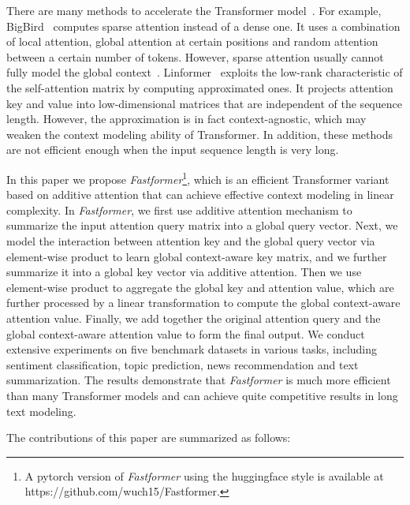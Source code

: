\documentclass[11pt,a4paper]{article}
\begin{document}
There are many methods to accelerate the Transformer model~\cite{beltagy2020longformer,zaheer2020big,wang2020linformer,Kitaev2020reformer,tay2021synthesizer}.
For example, BigBird~\cite{zaheer2020big} computes sparse attention instead of a dense one. 
It uses a combination of local attention, global attention at certain positions and random attention between a certain number of tokens.
However, sparse attention usually cannot fully model the global context~\cite{wu2021hi}.
Linformer~\cite{wang2020linformer} exploits the low-rank characteristic of the self-attention matrix by computing approximated ones.
It projects attention key and value into  low-dimensional matrices that are independent of the sequence length.
However, the approximation is in fact context-agnostic, which may weaken the context modeling ability of Transformer.
In addition, these methods are not efficient enough when the input sequence length is very long.


In this paper we propose \textit{Fastformer}\footnote{A pytorch version of \textit{Fastformer} using the huggingface style is available at https://github.com/wuch15/Fastformer.}, which is an efficient Transformer variant based on additive attention that can achieve effective context modeling in linear complexity. 
In \textit{Fastformer}, we first use additive attention mechanism to summarize the input attention query matrix into a global query vector.
Next, we model the interaction between attention key and the global query vector via element-wise product to learn global context-aware key matrix, and we further summarize it into a global key vector via additive attention.
Then we use element-wise product to aggregate the global key and attention value, which are further processed by a linear transformation to compute the global context-aware attention value.
Finally, we add together the original attention query and the global context-aware attention value to form the final output.
We conduct extensive experiments on five benchmark datasets in various tasks, including sentiment classification, topic prediction, news recommendation and text summarization. 
The results demonstrate that \textit{Fastformer} is much more efficient than many Transformer models and can achieve quite competitive results in long text modeling.

The contributions of this paper are summarized as follows:
\end{document}
